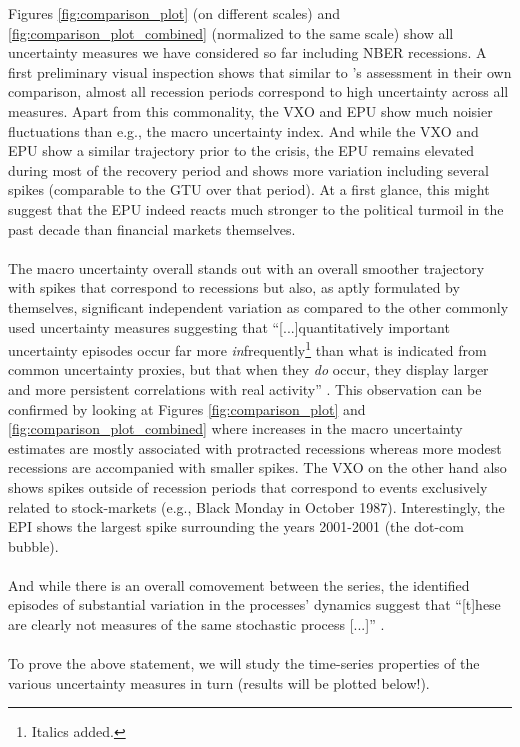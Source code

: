 \documentclass[a4paper,12pt,oneside,pointednumbers,bibtotoc,bigheadings,liststotoc]{scrbook}
\begin{document}
Figures \ref{fig:comparison_plot} (on different scales) and \ref{fig:comparison_plot_combined} (normalized to the same scale) show all uncertainty measures we have considered so far including NBER recessions. A first preliminary visual inspection shows that similar to \citet{bachmannetal:13}'s assessment in their own comparison, almost all recession periods correspond to high uncertainty across all measures. Apart from this commonality, the VXO and EPU show much noisier fluctuations than e.g., the macro uncertainty index. And while the VXO and EPU show a similar trajectory prior to the crisis, the EPU remains elevated during most of the recovery period and shows more variation including several spikes (comparable to the GTU over that period). At a first glance, this might suggest that the EPU indeed reacts much stronger to the political turmoil in the past decade than financial markets themselves. \\
\\
The macro uncertainty overall stands out with an overall smoother trajectory with spikes that correspond to recessions but also, as aptly formulated by \citet{juradoetal:15} themselves, significant independent variation as compared to the other commonly used uncertainty measures suggesting that ``[...]quantitatively important uncertainty episodes occur far more \textit{in}frequently\footnote{Italics added.} than what is indicated from common uncertainty proxies, but that when they \textit{do} occur, they display larger and more persistent correlations with real activity'' \citep[p. 1181]{juradoetal:15}. This observation can be confirmed by looking at Figures \ref{fig:comparison_plot} and \ref{fig:comparison_plot_combined} where increases in the macro uncertainty estimates are mostly associated with protracted recessions whereas more modest recessions are accompanied with smaller spikes. The VXO on the other hand also shows spikes outside of recession periods that correspond to events exclusively related to stock-markets (e.g., Black Monday in October 1987). Interestingly, the EPI shows the largest spike surrounding the years 2001-2001 (the dot-com bubble). \\
\\
And while there is an overall comovement between the series, the identified episodes of substantial variation in the processes' dynamics suggest that ``[t]hese are clearly not measures of the same stochastic process [...]'' \citep[p. ]{orlikandveldkamp:14}.\\
\\
To prove the above statement, we will study the time-series properties of the various uncertainty measures in turn (results will be plotted below!).
\end{document}
